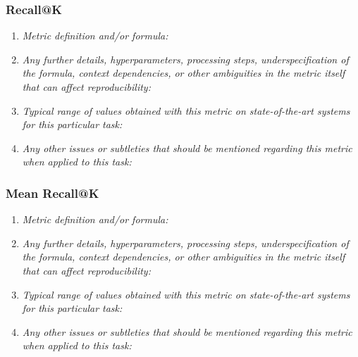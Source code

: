 \documentclass[a4paper,11pt]{article}
\begin{document}
        \subsubsection{Recall@K}
            \begin{enumerate}[label=\alph*.]
                \item \textit{Metric definition and/or formula:}
                \bigskip
                \item \textit{Any further details, hyperparameters, processing steps, underspecification of the formula, context dependencies, or other ambiguities in the metric itself that can affect reproducibility:}
                \bigskip
                \item \textit{Typical range of values obtained with this metric on state-of-the-art systems for this particular task:}
                \bigskip
                \item \textit{Any other issues or subtleties that should be mentioned regarding this metric when applied to this task:}
                \bigskip
            \end{enumerate}
        \subsubsection{Mean Recall@K}
            \begin{enumerate}[label=\alph*.]
                \item \textit{Metric definition and/or formula:}
                \bigskip
                \item \textit{Any further details, hyperparameters, processing steps, underspecification of the formula, context dependencies, or other ambiguities in the metric itself that can affect reproducibility:}
                \bigskip
                \item \textit{Typical range of values obtained with this metric on state-of-the-art systems for this particular task:}
                \bigskip
                \item \textit{Any other issues or subtleties that should be mentioned regarding this metric when applied to this task:}
                \bigskip
            \end{enumerate}
\end{document}

